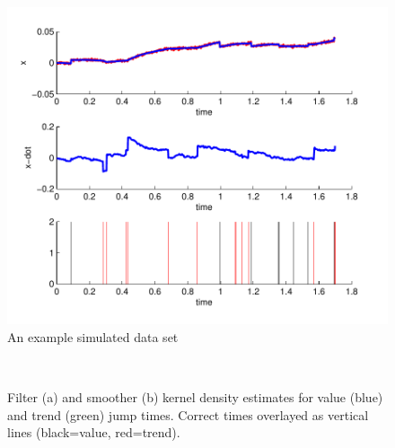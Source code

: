 \documentclass[journal]{IEEEtran}
\begin{document}
\begin{figure}[!t]
\centering
\includegraphics[width=0.95\columnwidth]{example_data.pdf}
\caption{An example simulated data set}
\label{fig:example_data}
\end{figure}

\begin{figure}[!t]
\centering
{} \\
\caption{Filter (a) and smoother (b) kernel density estimates for value (blue) and trend (green) jump times. Correct times overlayed as vertical lines (black=value, red=trend).}
\label{fig:example_kdest}
\end{figure}
\end{document}

